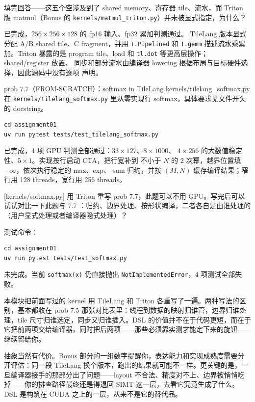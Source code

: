 \documentclass[11pt,a4paper,fontset=fandol]{ctexart}
\begin{document}
填完回答——这五个空涉及到了 shared memory、寄存器 tile、流水，而 Triton 版 matmul（Bonus 的 \texttt{kernels/matmul\_triton.py}）并未被显式指定，为什么？

\begin{answer}
已完成，$256\times256\times128$ 的 fp16 输入、fp32 累加判测通过。
TileLang 版本显式分配 A/B shared tile、C fragment，并用
\texttt{T.Pipelined} 和 \texttt{T.gemm} 描述流水乘累加。Triton 暴露的是
program tile、load 和 \texttt{tl.dot} 等更高层操作；shared/register 放置、
同步和部分流水由编译器 lowering 根据布局与目标硬件选择，因此源码中没有逐项
声明。
\end{answer}

\begin{capstone}{prob 7.7（FROM-SCRATCH）：softmax in TileLang \hfill {\footnotesize\ttfamily kernels/tilelang\_softmax.py}}
在 \texttt{kernels/tilelang\_softmax.py} 里从零实现行 softmax，具体要求见文件开头的 docstring。
\end{capstone}

\begin{lstlisting}
cd assignment01
uv run pytest tests/test_tilelang_softmax.py
\end{lstlisting}

\begin{answer}
已完成，4 项 GPU 判测全部通过：$33\times127$、$8\times1000$、
$4\times256$ 的大数值稳定性、$5\times1$。实现按行启动 CTA，把行宽补到
不小于 $N$ 的 2 次幂，越界位置填 $-\infty$，依次执行稳定的 max、exp、
sum 归约，并按 $(M,N)$ 缓存编译结果；窄行用 128 threads，宽行用 256
threads。
\end{answer}

[kernels/softmax.py]
用 Triton 重写 prob 7.7，此题可以不用 GPU。写完后可以试试对比一下此题与 7.7 ：归约、边界处理、按形状编译，二者各自是由谁处理的（用户显式处理或者编译器隐式处理）？

测试命令：

\begin{lstlisting}
cd assignment01
uv run pytest tests/test_softmax.py
\end{lstlisting}

\begin{answer}
未完成。当前 \texttt{softmax(x)} 仍直接抛出
\texttt{NotImplementedError}，4 项测试全部失败。
\end{answer}

\begin{lookback}
本模块把前面写过的 kernel 用 TileLang 和 Triton 各重写了一遍。两种写法的区别，基本都收在 prob 7.5 那张对比表里：线程到数据的映射归谁管，边界归谁处理，tile 尺寸归谁选定，同步又归谁插入。DSL 的价值并不在于代码更短，而在于它把前两项交给编译器，同时把后两项——那些必须靠实测才能定下来的旋钮——继续留给你。

抽象当然有代价。Bonus 部分的一组数字提醒你，表达能力和实现成熟度需要分开评估：同一段 TileLang 换个版本，跑出的结果就可能不一样。更关键的是，一旦编译器接手的那部分出了问题——layout 不合法、精度对不上、边界被悄悄吃掉——你的排查路径最终还是得退回 SIMT 这一层，去看它究竟生成了什么。DSL 是构筑在 CUDA 之上的一层，从来不是它的替代品。
\end{lookback}
\end{document}

